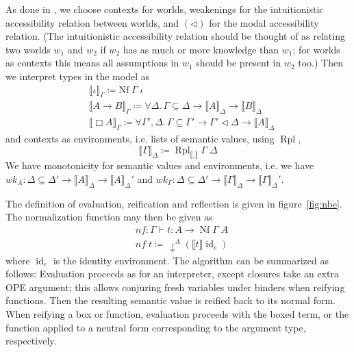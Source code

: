 \documentclass{article}
\begin{document}
As done in \cite{valliappan22}, we choose contexts for worlds,
weakenings for the intuitionistic accessibility relation between worlds, and
$(\lhd)$ for the modal accessibility relation.
(The intuitionistic accessibility relation should be thought of as
relating two worlds $w_1$ and $w_2$ if $w_2$ has as much or more knowledge than $w_1$;
for worlds as contexts this means all assumptions in $w_1$ should be present in $w_2$ too.)
Then we interpret types in the model as
\begin{align*}
  &\llbracket \iota \rrbracket_\Gamma \coloneqq \text{Nf} \; \Gamma \; \iota \\
  &\llbracket A \rightarrow B \rrbracket_\Gamma \coloneqq \forall \Delta. \, \Gamma \subseteq \Delta \rightarrow \llbracket A \rrbracket_\Delta \rightarrow \llbracket B \rrbracket_\Delta \\
  &\llbracket \Box A \rrbracket_\Gamma \coloneqq \forall \Gamma', \Delta. \, \Gamma \subseteq \Gamma' \rightarrow \Gamma'\lhd\Delta \rightarrow \llbracket A \rrbracket_\Delta
\end{align*}
and contexts as environments, i.e. lists of semantic values, using $\operatorname{Rpl}$,
$$ \llbracket \Gamma \rrbracket_\Delta \coloneqq \operatorname{Rpl}_{\llbracket\_\rrbracket} \Gamma \; \Delta $$
We have monotonicity for semantic values and environments,
i.e. we have
$wk_A : \Delta \subseteq \Delta' \rightarrow \llbracket A \rrbracket_\Delta \rightarrow \llbracket A \rrbracket_\Delta'$ and
$wk_\Gamma : \Delta \subseteq \Delta' \rightarrow \llbracket \Gamma \rrbracket_\Delta \rightarrow \llbracket \Gamma \rrbracket_\Delta'$.

The definition of evaluation, reification and reflection is given in figure~\ref{fig:nbe}.
The normalization function may then be given as
\begin{align*}
  &\textit{nf} : \Gamma \vdash t : A \rightarrow \operatorname{Nf} \Gamma \; A \\
  &\textit{nf} \; t \coloneqq \, \downarrow^A (\llbracket t \rrbracket \operatorname{id}_e)
\end{align*}
where $\operatorname{id}_e$ is the identity environment.
The algorithm can be summarized as follows:
Evaluation proceeds as for an interpreter,
except closures take an extra OPE argument;
this allows conjuring fresh variables under binders
when reifying functions.
Then the resulting semantic value is reified back to its normal form.
When reifying a box or function,
evaluation proceeds with the boxed term,
or the function applied to a neutral form corresponding to the argument type,
respectively.
\end{document}
